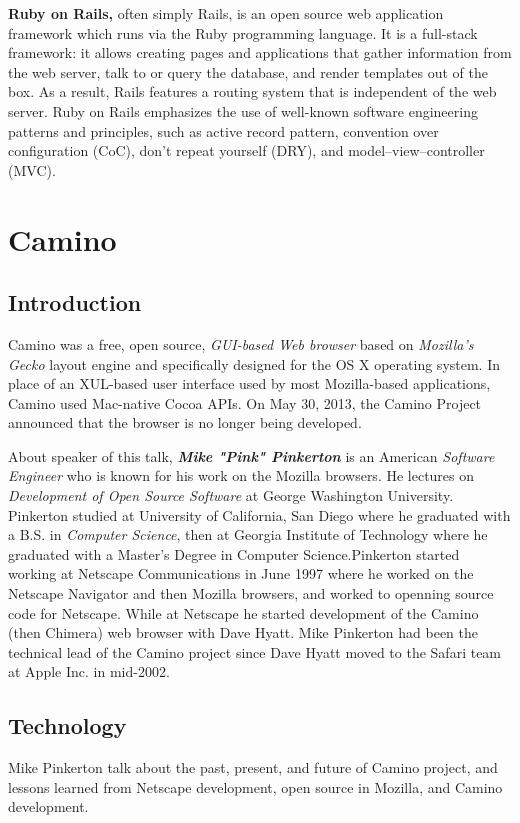\documentclass[11pt]{article}
\begin{document}
\textbf{Ruby on Rails,} often simply Rails, is an open source web application framework which runs via the Ruby programming language. It is a full-stack framework: it allows creating pages and applications that gather information from the web server, talk to or query the database, and render templates out of the box. As a result, Rails features a routing system that is independent of the web server. Ruby on Rails emphasizes the use of well-known software engineering patterns and principles, such as active record pattern, convention over configuration (CoC), don't repeat yourself (DRY), and model–view–controller (MVC).

\newpage


\section{Camino}

\subsection{Introduction}
Camino was a free, open source, \emph{GUI-based Web browser} based on \emph{Mozilla's Gecko }layout engine and specifically designed for the OS X operating system. In place of an XUL-based user interface used by most Mozilla-based applications, Camino used Mac-native Cocoa APIs. On May 30, 2013, the Camino Project announced that the browser is no longer being developed.

About speaker of this talk, \textbf{\emph{Mike "Pink" Pinkerton}} is an American \emph{Software Engineer} who is known for his work on the Mozilla browsers. He lectures on \emph{Development of Open Source Software} at George Washington University. Pinkerton studied at University of California, San Diego where he graduated with a B.S. in \emph{Computer Science}, then at Georgia Institute of Technology where he graduated with a Master's Degree in Computer Science.Pinkerton started working at Netscape Communications in June 1997 where he worked on the Netscape Navigator and then Mozilla browsers, and worked to openning source code for Netscape. While at Netscape he started development of the Camino (then Chimera) web browser with Dave Hyatt.  Mike Pinkerton had been the technical lead of the Camino project since Dave Hyatt moved to the Safari team at Apple Inc. in mid-2002.

\subsection{Technology}
Mike Pinkerton talk about the past, present, and future of Camino project, and lessons learned from Netscape development, open source in Mozilla, and Camino development.
\end{document}
